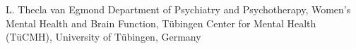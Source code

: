 
                {L. Thecla van Egmond}
                {Department of Psychiatry and Psychotherapy, Women’s Mental Health and Brain Function, Tübingen Center for Mental Health (TüCMH), University of Tübingen, Germany}
                